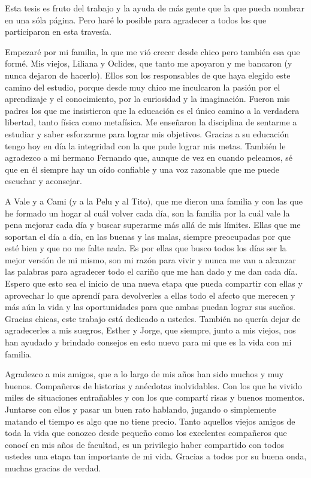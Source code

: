 \documentclass[
11pt, %
english, %
onehalfspacing, %
nolistspacing, %
headsepline, %
consistentlayout, %
]{MastersDoctoralThesis} %
\begin{document}
\begin{acknowledgements}
\addchaptertocentry{\acknowledgementname} %

  Esta tesis es fruto del trabajo y la ayuda de más gente que la que pueda 
  nombrar en una sóla página. Pero haré lo posible para agradecer a todos los
  que participaron en esta travesía.

  Empezaré por mi familia, la que me vió crecer desde chico pero también esa
  que formé. Mis viejos, Liliana y Oclides, que tanto me apoyaron y me bancaron
  (y nunca dejaron de hacerlo). Ellos son los responsables de que haya elegido
  este camino del estudio, porque desde muy chico me inculcaron la pasión por
  el aprendizaje y el conocimiento, por la curiosidad y la imaginación. Fueron
  mis padres los que me insistieron que la educación es el único camino a la
  verdadera libertad, tanto física como metafísica. Me enseñaron la disciplina
  de sentarme a estudiar y saber esforzarme para lograr mis objetivos. Gracias
  a su educación tengo hoy en día la integridad con la que pude lograr mis
  metas.  También le agradezco a mi hermano Fernando que, aunque de vez en
  cuando peleamos, sé que en él siempre hay un oído confiable y una voz
  razonable que me puede escuchar y aconsejar.  

  A Vale y a Cami (y a la Pelu y al Tito), que me dieron una familia y con las
  que he formado un hogar al cuál volver cada día, son la familia por la cuál
  vale la pena mejorar cada día y buscar superarme más allá de mis límites.
  Ellas que me soportan el día a día, en las buenas y las malas, siempre
  preocupadas por que esté bien y que no me falte nada. Es por ellas que busco
  todos los días ser la mejor versión de mi mismo, son mi razón para vivir y
  nunca me van a alcanzar las palabras para agradecer todo el cariño que me han
  dado y me dan cada día. Espero que esto sea el inicio de una nueva etapa que
  pueda compartir con ellas y aprovechar lo que aprendí para devolverles a
  ellas todo el afecto que merecen y más aún la vida y las oportunidades para
  que ambas puedan lograr sus sueños. Gracias chicas, este trabajo está
  dedicado a ustedes. También no quería dejar de agradecerles a mis suegros,
  Esther y Jorge, que siempre, junto a mis viejos, nos han ayudado y brindado
  consejos en esto nuevo para mi que es la vida con mi familia.

  Agradezco a mis amigos, que a lo largo de mis años han sido muchos y muy
  buenos.  Compañeros de historias y anécdotas inolvidables. Con los que he
  vivido miles de situaciones entrañables y con los que compartí risas y buenos
  momentos.  Juntarse con ellos y pasar un buen rato hablando, jugando o
  simplemente matando el tiempo es algo que no tiene precio.  Tanto aquellos
  viejos amigos de toda la vida que conozco desde pequeño como los excelentes
  compañeros que conocí en mis años de facultad, es un privilegio haber
  compartido con todos ustedes una etapa tan importante de mi vida. Gracias a
  todos por su buena onda, muchas gracias de verdad.


\end{acknowledgements}
\end{document}
